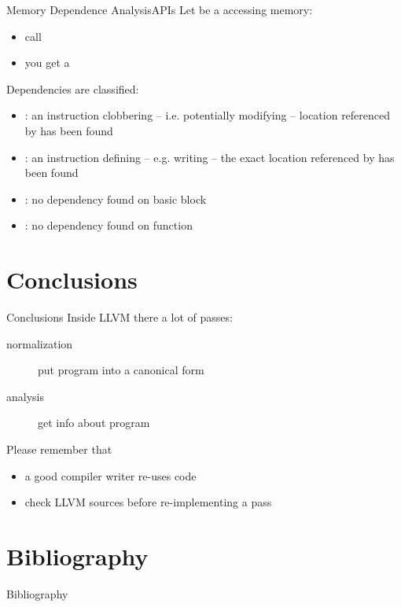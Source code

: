 \documentclass[10pt,mathserif]{beamer}
\begin{document}
\begin{frame}{Memory Dependence Analysis}{APIs}
Let  be a  accessing memory:

\begin{itemize}
\item call 
\item you get a 
\end{itemize}

\vfill
Dependencies are classified:

\begin{itemize}
\item {}: an instruction clobbering --
      i.e. potentially modifying -- location referenced by 
      has been found
\item {}: an instruction defining -- e.g.
      writing -- the exact location referenced by  has been
      found
\item {}: no dependency found on
       basic block
\item {}: no dependency found on
       function
\end{itemize}
\end{frame}

\section{Conclusions}
\begin{frame}{Conclusions}
Inside LLVM there a lot of passes:

\begin{description}
\item[normalization] put program into a canonical form
\item[analysis] get info about program
\end{description}

\vfill
Please remember that

\begin{itemize}
\item a good compiler writer \alert{re-uses} code
\item check LLVM sources before re-implementing a pass
\end{itemize}
\vfill
\end{frame}

\section{Bibliography}
\begin{frame}[allowframebreaks]{Bibliography}
\nocite{*}


\end{frame}
\end{document}

